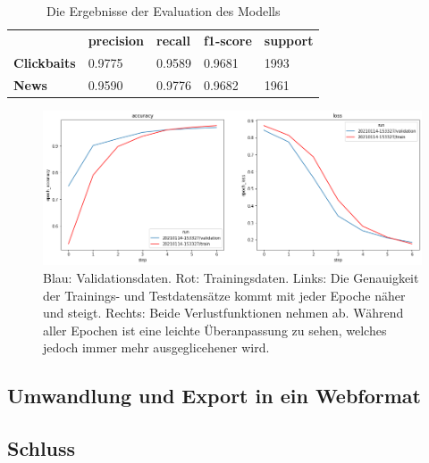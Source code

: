 \begin{table}[h]
    \caption{Die Ergebnisse der Evaluation des Modells}
    \label{eval1}
    \renewcommand{\arraystretch}{1.2}
    \centering
    \sffamily
    \begin{footnotesize}
        \begin{tabular}{l l l l l}
            \toprule
                           & \textbf{precision} & \textbf{recall} & \textbf{f1-score} & \textbf{support} \\
            \textbf{Clickbaits} & 0.9775                  & 0.9589                 & 0.9681                & 1993          \\
            \textbf{News}  & 0.9590                 & 0.9776                & 0.9682               & 1961                     \\
            \bottomrule
        \end{tabular}
    \end{footnotesize}
    \rmfamily
\end{table}

\begin{figure}[H]
    \centering
    \includegraphics[width=15cm]{kapitel5/acur.png}
    \caption[Vergleich der Genauigkeit mit dem Verlust]{Blau: Validationsdaten. Rot: Trainingsdaten. Links: Die Genauigkeit der Trainings- und Testdatensätze kommt mit jeder Epoche näher und steigt. Rechts: Beide Verlustfunktionen nehmen ab. Während aller Epochen ist eine leichte Überanpassung zu sehen, welches jedoch immer mehr ausgeglicehener wird.}
    \label{Kap5:Val}
\end{figure}


\subsection{Umwandlung und Export in ein Webformat}
\subsection{Schluss}
